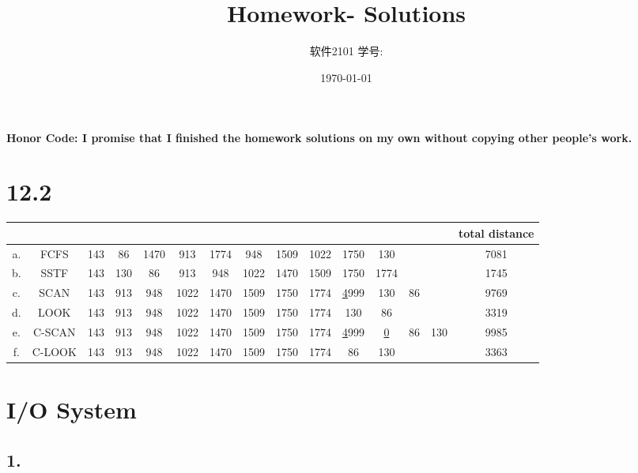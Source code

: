 \documentclass[11pt]{article}
\title{\vspace{-4cm}\CourseCodeName \space
        \Session \protect\\  Homework-\textbf{\Homework} Solutions}
\author{软件2101 \Name \space 学号: \SID}
\date{\today}
\begin{document}
\maketitle
\vspace{-0.8cm}
\textbf{Honor Code: I promise that I finished the homework solutions on my own without copying other people's 
    work.}

\section*{12.2}


\begin{table}[H]
    \begin{tabular}{|c|c|c|c|c|c|c|c|c|c|c|c|c|c|c|}
    \hline
       &        &     &     &      &      &      &      &      &      &            &         &    &     & total distance \\ \hline
    a. & FCFS   & 143 & 86  & 1470 & 913  & 1774 & 948  & 1509 & 1022 & 1750       & 130     &    &     & 7081           \\ \hline
    b. & SSTF   & 143 & 130 & 86   & 913  & 948  & 1022 & 1470 & 1509 & 1750       & 1774    &    &     & 1745           \\ \hline
    c. & SCAN   & 143 & 913 & 948  & 1022 & 1470 & 1509 & 1750 & 1774 & {\ul 4999} & 130     & 86 &     & 9769           \\ \hline
    d. & LOOK   & 143 & 913 & 948  & 1022 & 1470 & 1509 & 1750 & 1774 & 130        & 86      &    &     & 3319           \\ \hline
    e. & C-SCAN & 143 & 913 & 948  & 1022 & 1470 & 1509 & 1750 & 1774 & {\ul 4999} & {\ul 0} & 86 & 130 & 9985           \\ \hline
    f. & C-LOOK & 143 & 913 & 948  & 1022 & 1470 & 1509 & 1750 & 1774 & 86         & 130     &    &     & 3363           \\ \hline
    \end{tabular}
\end{table}

\section*{I/O System}

\subsection*{1. }
\end{document}
